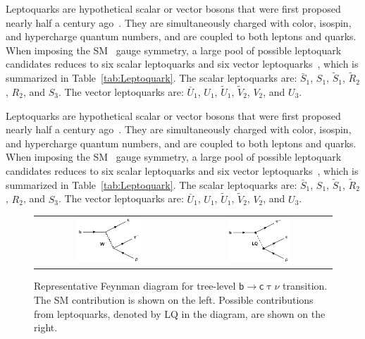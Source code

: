 Leptoquarks are hypothetical scalar or vector bosons that were first proposed nearly half a century ago~\cite{Pati:1973uk}. They are simultaneously charged with color, isospin, and hypercharge quantum numbers, and are coupled to both leptons and quarks. When imposing the \ac{SM} \sm~gauge symmetry, a large pool of possible leptoquark candidates reduces to six scalar leptoquarks and six vector leptoquarks~\cite{Dorsner:2016wpm}, which is summarized in Table~\ref{tab:Leptoquark}. The scalar leptoquarks are: $\bar{S}_{1}$, $S_{1}$, $\tilde{S}_{1}$, $\tilde{R}_{2}$, $R_{2}$, and $S_{3}$. The vector leptoquarks are: $\bar{U}_{1}$, $U_{1}$, $\tilde{U}_{1}$, $\tilde{V}_{2}$, $V_{2}$, and $U_{3}$. 

Leptoquarks are hypothetical scalar or vector bosons that were first proposed nearly half a century ago~\cite{Pati:1973uk}. They are simultaneously charged with color, isospin, and hypercharge quantum numbers, and are coupled to both leptons and quarks. When imposing the \ac{SM} \sm~gauge symmetry, a large pool of possible leptoquark candidates reduces to six scalar leptoquarks and six vector leptoquarks~\cite{Dorsner:2016wpm}, which is summarized in Table~\ref{tab:Leptoquark}. The scalar leptoquarks are: $\bar{S}_{1}$, $S_{1}$, $\tilde{S}_{1}$, $\tilde{R}_{2}$, $R_{2}$, and $S_{3}$. The vector leptoquarks are: $\bar{U}_{1}$, $U_{1}$, $\tilde{U}_{1}$, $\tilde{V}_{2}$, $V_{2}$, and $U_{3}$. 

\begin{figure}[tbh!]
 \begin{center}
 \begin{tabular}{cc}
 \includegraphics[width=0.45\textwidth]{figures/Part1/BSM/SMbtoc}&
 \includegraphics[width=0.45\textwidth]{figures/Part1/BSM/Leptoquark}\\
 \end{tabular}
 \caption{Representative Feynman diagram for tree-level $\textsf{b}\rightarrow\textsf{c}\uptau\nu$ transition. The \ac{SM} contribution is shown on the left. Possible contributions from leptoquarks, denoted by LQ in the diagram, are shown on the right.}
 \label{fig:Leptoquark}
 \end{center}
\end{figure}

